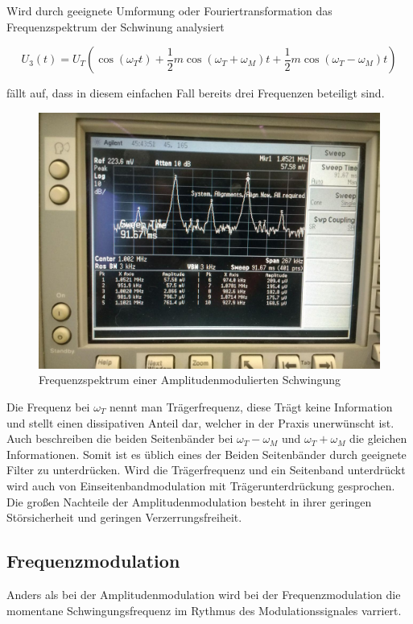 Wird durch geeignete Umformung oder Fouriertransformation das Frequenzspektrum der Schwinung analysiert

\begin{equation}
U_{3}(t) = U_T ( \cos(\omega_T t) + \frac{1}{2}m\cos(\omega_T + \omega_M)t + \frac{1}{2}m\cos(\omega_T - \omega_M)t)
\label{eq:FreqAmMod}
\end{equation}

fällt auf, dass in diesem einfachen Fall bereits drei Frequenzen beteiligt sind.

\begin{figure}
	\centering
	\includegraphics[width=\textwidth]{img/Aufgabenteil_b.jpg}
	\caption{Frequenzspektrum einer Amplitudenmodulierten Schwingung}
\end{figure}

Die Frequenz bei $\omega_T$ nennt man Trägerfrequenz, diese Trägt keine Information und stellt einen dissipativen Anteil dar, welcher in der Praxis unerwünscht ist. Auch beschreiben die beiden Seitenbänder bei $\omega_T - \omega_M$ und $\omega_T + \omega_M$ die gleichen Informationen. Somit ist es üblich eines der Beiden Seitenbänder durch geeignete Filter zu unterdrücken.
Wird die Trägerfrequenz und ein Seitenband unterdrückt wird auch von Einseitenbandmodulation mit Trägerunterdrückung gesprochen.
Die großen Nachteile der Amplitudenmodulation besteht in ihrer geringen Störsicherheit und geringen Verzerrungsfreiheit.

\subsection{Frequenzmodulation}
Anders als bei der Amplitudenmodulation wird bei der Frequenzmodulation die momentane Schwingungsfrequenz im Rythmus des Modulationssignales varriert.

